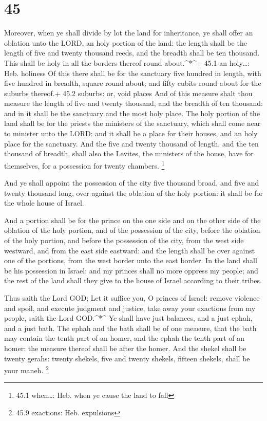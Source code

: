 \hypertarget{section-44}{%
\section{45}\label{section-44}}

 Moreover, when ye shall divide by lot the land for
inheritance, ye shall offer an oblation unto the LORD, an holy portion
of the land: the length shall be the length of five and twenty thousand
reeds, and the breadth shall be ten thousand. This shall be holy in all
the borders thereof round about.\^{}*\^{}+ 45.1 an holy\ldots: Heb.
holiness  Of this there shall be for the sanctuary five
hundred in length, with five hundred in breadth, square round about; and
fifty cubits round about for the suburbs thereof.+ 45.2 suburbs: or,
void places  And of this measure shalt thou measure the
length of five and twenty thousand, and the breadth of ten thousand: and
in it shall be the sanctuary and the most holy place.  The
holy portion of the land shall be for the priests the ministers of the
sanctuary, which shall come near to minister unto the LORD: and it shall
be a place for their houses, and an holy place for the sanctuary.
 And the five and twenty thousand of length, and the ten
thousand of breadth, shall also the Levites, the ministers of the house,
have for themselves, for a possession for twenty chambers. \footnote{45.1
  when\ldots: Heb. when ye cause the land to fall}

 And ye shall appoint the possession of the city five
thousand broad, and five and twenty thousand long, over against the
oblation of the holy portion: it shall be for the whole house of Israel.

 And a portion shall be for the prince on the one side and
on the other side of the oblation of the holy portion, and of the
possession of the city, before the oblation of the holy portion, and
before the possession of the city, from the west side westward, and from
the east side eastward: and the length shall be over against one of the
portions, from the west border unto the east border.  In the
land shall be his possession in Israel: and my princes shall no more
oppress my people; and the rest of the land shall they give to the house
of Israel according to their tribes.

 Thus saith the Lord GOD; Let it suffice you, O princes of
Israel: remove violence and spoil, and execute judgment and justice,
take away your exactions from my people, saith the Lord GOD.\^{}*\^{}
 Ye shall have just balances, and a just ephah, and a just
bath.  The ephah and the bath shall be of one measure, that
the bath may contain the tenth part of an homer, and the ephah the tenth
part of an homer: the measure thereof shall be after the homer.
 And the shekel shall be twenty gerahs: twenty shekels,
five and twenty shekels, fifteen shekels, shall be your maneh.
\footnote{45.9 exactions: Heb. expulsions}

